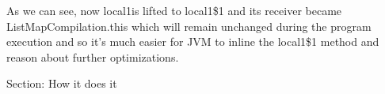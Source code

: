 %      

As we can see, now local1is lifted to local1\$1 and its receiver became
ListMapCompilation.this which will remain unchanged during the program
execution and so it's much easier for JVM to inline the local1\$1 method and
reason about further optimizations.


Section: How it does it